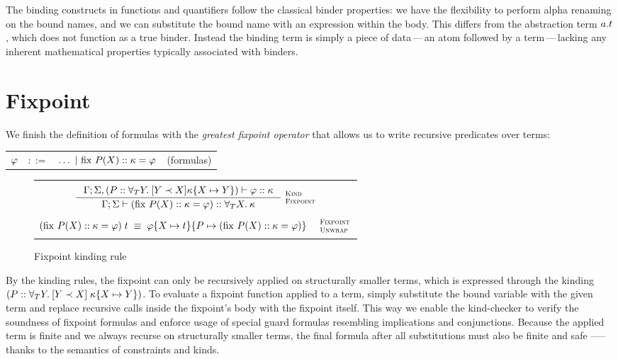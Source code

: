 \documentclass[english, mgr]{iithesis}
\renewcommand{\it}[1]{\textit{#1}}
\newcommand{\fix}[3]{\ensuremath{\text{fix }#1(#2)\ofkind#3=}}\newcommand{\myatop}[2]{\ensuremath{\genfrac{}{}{0pt}{}{#1\hfill}{#2\hfill}}}
\newcommand{\scbrk}[2]{\myatop{\textsc{#1}}{\textsc{#2}}}
\newcommand{\mdash}{\,---\,}
\def\-{{\mdash}}
\begin{document}
The binding constructs in functions and quantifiers follow the classical binder properties: we have the flexibility to perform alpha renaming on the bound names, and we can substitute the bound name with an expression within the body.
This differs from the abstraction term $a.t$, which
does not function as a true binder.
Instead the binding term is simply a piece of data\-an atom followed by a term\-lacking any inherent mathematical properties typically associated with binders.

\section{Fixpoint}
We finish the definition of formulas with the \it{greatest fixpoint operator}
that allows us to write recursive predicates over terms:
\\
\begin{tabular}{rrlr}
$\varphi$ & $::=$ & $\ldots
               \bnfor \fix{\propv}{\termv}{\kind}{\formphi} $
    & (formulas)
\end{tabular}

\begin{figure}[htpb]
  \begin{tabularx}{\textwidth}{|C|}
    \hline \\ $
\inference{
  \cEnv;\kEnv, (\propv \ofkind \kForallTerm{Y} \kGuard{Y \cshlt \termv}{\kind\subst{\termv}{Y}})\vdash \formphi \ofkind \kind
}{
  \cEnv;\kEnv\vdash (\fix{\propv}{\termv}{\kind}{\formphi}) \ofkind \kForallTerm{\termv}{\kind}
}\:\scbrk{Kind}{Fixpoint}
  $ \\ \\
  $
(\fix{\propv}{\termv}{\kind}{\formphi})\fApp\term
\;\equiv\;
\formphi\subst{\termv}{\term}\subst{\propv}{(\fix{\propv}{\termv}{\kind}{\formphi})}
\quad\:\scbrk{Fixpoint}{Unwrap}$
  \\ \\ \hline
\end{tabularx}
  \caption{Fixpoint kinding rule}
  \label{fig:fixpoint-kinding}
\end{figure}
By the kinding rules, the fixpoint can only be recursively applied on structurally smaller terms,
which is expressed through the kinding $(P :: \forall_T Y .\: [Y \prec X]{\;\kappa\{X\mapsto Y\}})$.
To evaluate a fixpoint function applied to a term, simply substitute the bound
variable with the given term and replace recursive calls inside the fixpoint's body with the fixpoint itself.
This way we enable the kind-checker to verify the soundness of fixpoint formulas
and enforce usage of special guard formulas resembling implications and conjunctions.
Because the applied term is finite
and we always recurse on structurally smaller terms,
the final formula after all substitutions must also be finite and safe
--— thanks to the semantics of constraints and kinds.
\end{document}
